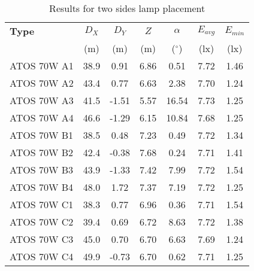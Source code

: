 \begin{table}[htb]
	\renewcommand{\arraystretch}{1.3}
	\caption{Results for two sides lamp placement}
 	\label{tab:twosideLamps}
	\centering
  \begin{tabular}{ l | c | c | c | c | c | c }
    \hline
    \textbf{Type} & $D_X$ & $D_Y$ & $Z$ & $\alpha$ & $E_{avg}$ & $E_{min}$\\ 
    & (m) & (m) & (m) & ($^\circ$) & (lx) & (lx)\\ \hline
    ATOS 70W A1 & 38.9 & 0.91 & 6.86 & 0.51 & 7.72 & 1.46 \\ \hline
    ATOS 70W A2 & 43.4 & 0.77 & 6.63 & 2.38 & 7.70 & 1.24\\ \hline
    ATOS 70W A3 & 41.5 & -1.51 & 5.57 & 16.54 & 7.73 & 1.25\\ \hline
    ATOS 70W A4 & 46.6 & -1.29 & 6.15 & 10.84 & 7.68 & 1.25\\ \hline\hline
    ATOS 70W B1 & 38.5 & 0.48 & 7.23 & 0.49 & 7.72 & 1.34\\ \hline
    ATOS 70W B2 & 42.4 & -0.38 & 7.68 & 0.24 & 7.71 & 1.41\\ \hline
    ATOS 70W B3 & 43.9 & -1.33 & 7.42 & 7.99 & 7.72 & 1.54\\ \hline
    ATOS 70W B4 & 48.0 & 1.72 & 7.37 & 7.19 & 7.72 & 1.25\\ \hline\hline
    ATOS 70W C1 & 38.3 & 0.77 & 6.96 & 0.36 & 7.71 & 1.54\\ \hline
    ATOS 70W C2 & 39.4 & 0.69 & 6.72 & 8.63 & 7.72 & 1.38\\ \hline
    ATOS 70W C3 & 45.0 & 0.70 & 6.70 & 6.63 & 7.69 & 1.24\\ \hline
    ATOS 70W C4 & 49.9 & -0.73 & 6.70 & 0.62 & 7.71 & 1.25\\ \hline
  \end{tabular}
\end{table}
